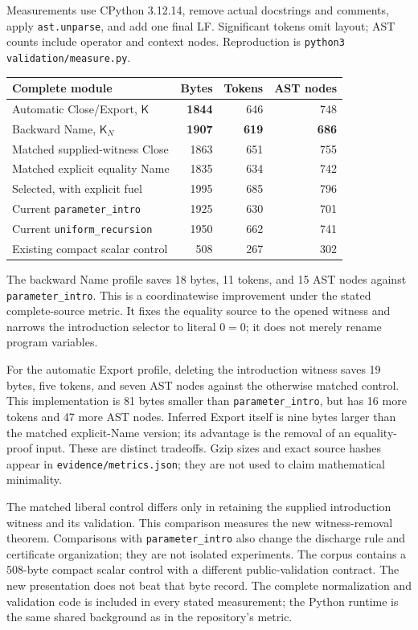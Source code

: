 \documentclass[11pt,letterpaper]{article}
\theoremstyle{definition}\newtheorem{definition}[theorem]{Definition}
\theoremstyle{remark}\newtheorem{remark}[theorem]{Remark}
\newcommand{\K}{\mathsf K}
\newcommand{\KN}{\mathsf K_{\!N}}
\newcommand{\file}[1]{{\small\nolinkurl{#1}}}
\begin{document}
Measurements use CPython 3.12.14, remove actual docstrings and comments,
apply \texttt{ast.unparse}, and add one final LF. Significant tokens omit
layout; AST counts include operator and context nodes. Reproduction is
\texttt{python3 validation/measure.py}.
\begin{center}\small
\begin{tabularx}{\linewidth}{@{}Xrrr@{}}
\toprule
Complete module & Bytes & Tokens & AST nodes\\
\midrule
Automatic Close/Export, $\K$ & \textbf{1844} & 646 & 748\\
Backward Name, $\KN$ & \textbf{1907} & \textbf{619} & \textbf{686}\\
Matched supplied-witness Close & 1863 & 651 & 755\\
Matched explicit equality Name & 1835 & 634 & 742\\
Selected, with explicit fuel & 1995 & 685 & 796\\
Current \file{parameter_intro} & 1925 & 630 & 701\\
Current \file{uniform_recursion} & 1950 & 662 & 741\\
Existing compact scalar control & 508 & 267 & 302\\
\bottomrule
\end{tabularx}
\end{center}
The backward Name profile saves 18 bytes, 11 tokens, and 15 AST nodes
against \file{parameter_intro}. This is a coordinatewise improvement
under the stated complete-source metric. It fixes the equality source
to the opened witness and narrows the introduction selector to literal
$0=0$; it does not merely rename program variables.

For the automatic Export profile, deleting the introduction witness
saves 19 bytes, five tokens, and seven AST nodes against the otherwise
matched control. This implementation is 81 bytes smaller than
\file{parameter_intro}, but has 16 more tokens and 47 more AST nodes.
Inferred Export itself is nine bytes larger than
the matched explicit-Name version; its advantage is the removal of an
equality-proof input. These are distinct tradeoffs. Gzip sizes and exact
source hashes appear in \file{evidence/metrics.json}; they are not used
to claim mathematical minimality.

The matched liberal control differs only in retaining the supplied
introduction witness and its validation. This comparison measures the
new witness-removal theorem. Comparisons with \file{parameter_intro}
also change the discharge rule and certificate organization; they are
not isolated experiments. The corpus contains a 508-byte compact scalar
control with a different public-validation contract. The new presentation
does not beat that byte record. The complete normalization and validation
code is included in every stated measurement; the Python runtime is
the same shared background as in the repository's metric.
\end{document}
